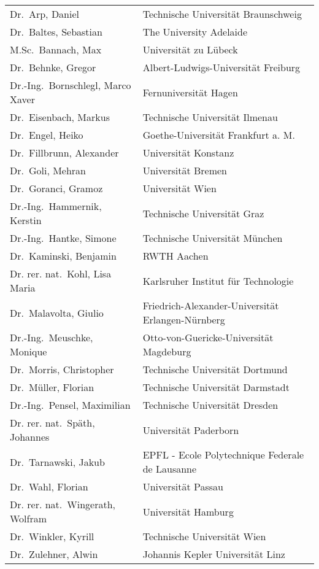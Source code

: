 \documentclass{lni}
\begin{document}
\begin{tabular}{l@{\hspace{10pt}}l}
	Dr.\ Arp, Daniel & Technische Universität Braunschweig\\
	Dr.\ Baltes, Sebastian & The University Adelaide\\
	M.Sc.\ Bannach, Max & Universität zu Lübeck\\
	Dr.\ Behnke, Gregor & Albert-Ludwigs-Universität Freiburg\\
	Dr.-Ing.\ Bornschlegl, Marco Xaver & Fernuniversität Hagen\\
	Dr.\ Eisenbach, Markus & Technische Universität Ilmenau\\
	Dr.\ Engel, Heiko & Goethe-Universität Frankfurt a. M.\\
	Dr.\ Fillbrunn, Alexander & Universität Konstanz\\
	Dr.\ Goli, Mehran & Universität Bremen\\
	Dr.\ Goranci, Gramoz & Universität Wien\\
	Dr.-Ing.\ Hammernik, Kerstin & Technische Universität Graz\\
	Dr.-Ing.\ Hantke, Simone & Technische Universität München\\
	Dr.\ Kaminski, Benjamin & RWTH Aachen\\
	Dr. rer. nat.\ Kohl, Lisa Maria & Karlsruher Institut für Technologie\\
	Dr.\ Malavolta, Giulio & Friedrich-Alexander-Universität Erlangen-Nürnberg\\
	Dr.-Ing.\ Meuschke, Monique & Otto-von-Guericke-Universität Magdeburg\\
	Dr.\ Morris, Christopher & Technische Universität Dortmund\\
	Dr.\ Müller, Florian & Technische Universität Darmstadt\\
	Dr.-Ing.\ Pensel, Maximilian & Technische Universität Dresden\\
	Dr. rer. nat.\ Späth, Johannes & Universität Paderborn\\
	Dr.\ Tarnawski, Jakub & EPFL - Ecole Polytechnique Federale de Lausanne\\
	Dr.\ Wahl, Florian & Universität Passau\\
	Dr. rer. nat.\ Wingerath, Wolfram & Universität Hamburg\\
	Dr.\ Winkler, Kyrill & Technische Universität Wien\\
	Dr.\ Zulehner, Alwin & Johannis Kepler Universität Linz\\


\end{tabular}
\end{document}
